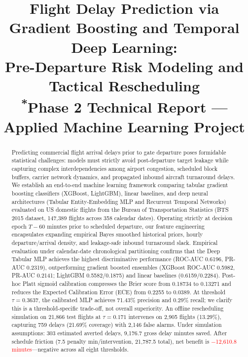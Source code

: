 \documentclass[conference]{IEEEtran}
\begin{document}
\title{Flight Delay Prediction via Gradient Boosting and Temporal Deep Learning:\\
Pre-Departure Risk Modeling and Tactical Rescheduling\\
{\footnotesize \textsuperscript{*}Phase 2 Technical Report --- Applied Machine Learning Project}
}

\author{
}

\maketitle

\begin{abstract}
Predicting commercial flight arrival delays prior to gate departure poses formidable statistical challenges: models must strictly avoid post-departure target leakage while capturing complex interdependencies among airport congestion, scheduled block buffers, carrier network dynamics, and propagated inbound aircraft turnaround delays. We establish an end-to-end machine learning framework comparing tabular gradient boosting classifiers (XGBoost, LightGBM), linear baselines, and deep neural architectures (Tabular Entity-Embedding MLP and Recurrent Temporal Networks) evaluated on US domestic flights from the Bureau of Transportation Statistics (BTS 2015 dataset, 147,389 flights across 358 calendar dates). Operating strictly at decision epoch $T - 60$ minutes prior to scheduled departure, our feature engineering encapsulates expanding empirical Bayes smoothed historical priors, hourly departure/arrival density, and leakage-safe inbound turnaround slack. Empirical evaluation under calendar-date chronological partitioning confirms that the Deep Tabular MLP achieves the highest discriminative performance (ROC-AUC \mbox{0.6196}, PR-AUC \mbox{0.2319}), outperforming gradient boosted ensembles (XGBoost ROC-AUC \mbox{0.5982}, PR-AUC \mbox{0.2141}; LightGBM \mbox{0.5582}/\mbox{0.1875}) and linear baselines (\mbox{0.6159}/\mbox{0.2284}). Post-hoc Platt sigmoid calibration compresses the Brier score from \mbox{0.18734} to \mbox{0.13271} and reduces the Expected Calibration Error (ECE) from \mbox{0.2255} to \mbox{0.0389}. At threshold $\tau = 0.3637$, the calibrated MLP achieves \mbox{71.43\%} precision and \mbox{0.29\%} recall; we clarify this is a threshold-specific trade-off, not overall superiority. An offline rescheduling simulation on 21,866 test flights at $\tau = 0.171$ intervenes on \mbox{2,905} flights (\mbox{13.29\%}), capturing \mbox{759} delays (\mbox{21.69\%} coverage) with \mbox{2,146} false alarms. Under simulation assumptions: \mbox{303} estimated averted delays, \mbox{9,176.7} gross delay minutes saved. After schedule friction (\mbox{7.5} penalty min/intervention, \mbox{21,787.5} total), net benefit is \textcolor{red}{\mbox{$-$12,610.8} minutes}---negative across all eight thresholds.
\end{abstract}
\end{document}
